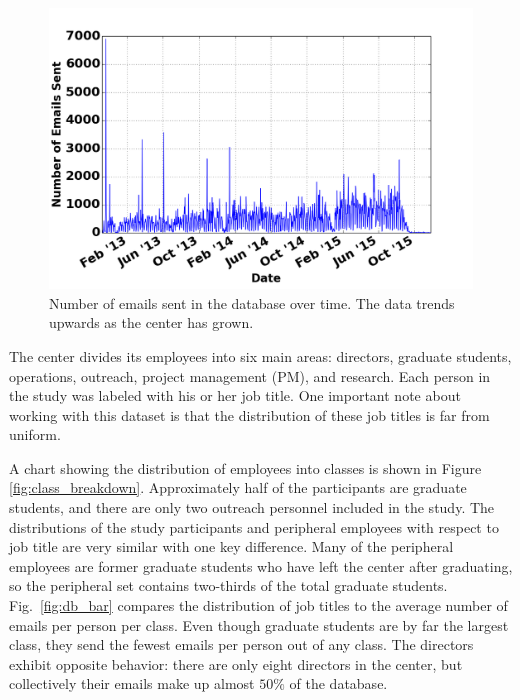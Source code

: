 \documentclass[12pt]{report}
\begin{document}
\begin{figure}[t]
	\centering
	\includegraphics[width=\columnwidth,trim={0mm 0mm 0mm 0mm},clip]{emails_over_time}
	\caption[Center emails over time]{Number of emails sent in the database over time.  The data trends upwards as the center has grown.}
	\label{fig:emails_over_time}
\end{figure}


The center divides its employees into six main areas: directors, graduate students, operations, outreach, project management (PM), and research. 
Each person in the study was labeled with his or her job title.
One important note about working with this dataset is that the distribution of these job titles is far from uniform.

A chart showing the distribution of employees into classes is shown in Figure \ref{fig:class_breakdown}.
Approximately half of the participants are graduate students, and there are only two outreach personnel included in the study.
The distributions of the study participants and peripheral employees with respect to job title are very similar with one key difference.
Many of the peripheral employees are former graduate students who have left the center after graduating, so the peripheral set contains two-thirds of the total graduate students.
Fig.~\ref{fig:db_bar} compares the distribution of job titles to the average number of emails per person per class.
Even though graduate students are by far the largest class, they send the fewest emails per person out of any class.
The directors exhibit opposite behavior: there are only eight directors in the center, but collectively their emails make up almost $50\%$ of the database.
\end{document}
